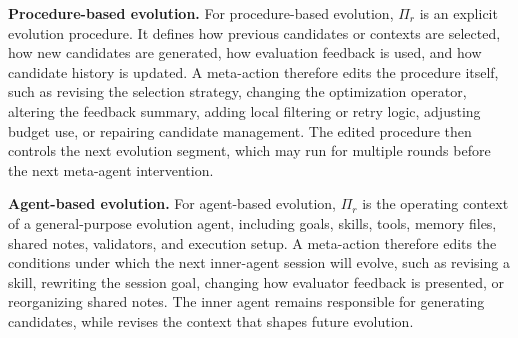 \textbf{Procedure-based evolution.}
For procedure-based evolution, $\Pi_r$ is an explicit evolution procedure.
It defines how previous candidates or contexts are selected, how new candidates are generated, how evaluation feedback is used, and how candidate history is updated.
A meta-action therefore edits the procedure itself, such as revising the selection strategy, changing the optimization operator, altering the feedback summary, adding local filtering or retry logic, adjusting budget use, or repairing candidate management.
The edited procedure then controls the next evolution segment, which may run for multiple rounds before the next meta-agent intervention.

\textbf{Agent-based evolution.}
For agent-based evolution, $\Pi_r$ is the operating context of a general-purpose evolution agent, including goals, skills, tools, memory files, shared notes, validators, and execution setup.
A meta-action therefore edits the conditions under which the next inner-agent session will evolve, such as revising a skill, rewriting the session goal, changing how evaluator feedback is presented, or reorganizing shared notes.
The inner agent remains responsible for generating candidates, while \method revises the context that shapes future evolution.